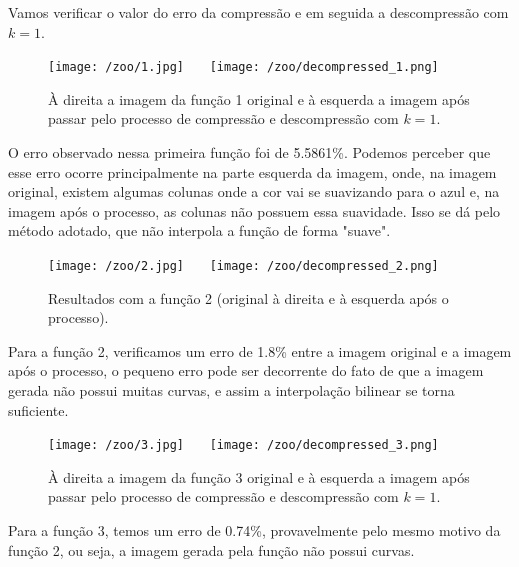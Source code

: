 \documentclass{article}
\begin{document}
		Vamos verificar o valor do erro da compressão e em seguida a descompressão com $k = 1$.
		\pagebreak
		\begin{figure}[H]
			\centering
			\captionsetup{justification=centering}
			\texttt{[image: /zoo/1.jpg]} \ \ \
			\texttt{[image: /zoo/decompressed\_1.png]} \\
			\caption{À direita a imagem da função 1 original e à esquerda a imagem após passar pelo processo de compressão e descompressão com $k = 1$.}  
			
		\end{figure}\par
		O erro observado nessa primeira função foi de 5.5861\%. Podemos perceber que esse erro ocorre principalmente na parte esquerda da imagem, onde, na imagem original, existem algumas colunas onde a cor vai se suavizando para o azul e, na imagem após o processo, as colunas não possuem essa suavidade. Isso se dá pelo método adotado, que não interpola a função de forma "suave".
		
		\begin{figure}[H]
			\centering
			\captionsetup{justification=centering}
			\texttt{[image: /zoo/2.jpg]} \ \ \
			\texttt{[image: /zoo/decompressed\_2.png]} \\
			\caption{Resultados com a função 2 (original à direita e à esquerda após o processo).}  
		\end{figure}\par
		Para a função 2, verificamos um erro de 1.8\% entre a imagem original e a imagem após o processo, o pequeno erro pode ser decorrente do fato de que a imagem gerada não possui muitas curvas, e assim a interpolação bilinear se torna suficiente.\par
		
		\begin{figure}[H]
			\centering
			\captionsetup{justification=centering}
			\texttt{[image: /zoo/3.jpg]} \ \ \
			\texttt{[image: /zoo/decompressed\_3.png]} \\
			\caption{À direita a imagem da função 3 original e à esquerda a imagem após passar pelo processo de compressão e descompressão com $k = 1$.}  
			\label{func3}
		\end{figure}\par
		Para a função 3, temos um erro de 0.74\%, provavelmente pelo mesmo motivo da função 2, ou seja, a imagem gerada pela função não possui curvas.
		
\end{document}
